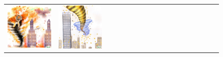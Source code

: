 \begin{figure}[ht!]
\begin{adjustwidth}{-0.8in}{-0.5in}
\begin{tabular}{cccccccccccccccccccc}
\multicolumn{2}{c}{\includegraphics[width=\threebythreecolwidth\textwidth]{figures/cherries/tiger_watercolor.jpg}} &
\multicolumn{2}{c}{\includegraphics[width=\threebythreecolwidth\textwidth]{figures/cherries/bees_watercolor.jpg}} &&

\end{tabular}
\end{adjustwidth}
\end{figure}

